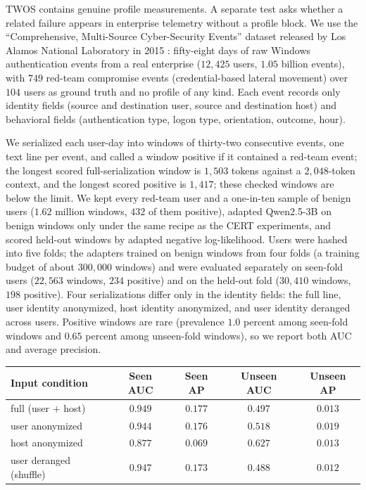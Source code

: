 \documentclass[10pt]{article} %
\begin{document}
TWOS contains genuine profile measurements. A separate test asks whether
a related failure appears in enterprise telemetry without a profile
block. We use the ``Comprehensive, Multi-Source Cyber-Security Events'' dataset released
by Los Alamos National Laboratory in 2015 \citep{kent2015comprehensive}: fifty-eight days of raw Windows
authentication events from a real enterprise ($12{,}425$ users, $1.05$
billion events), with $749$
red-team compromise events (credential-based lateral movement) over $104$
users as ground truth and no profile of any kind. Each event records only
identity fields (source and destination user, source and destination
host) and behavioral fields (authentication type, logon type,
orientation, outcome, hour).

We serialized each user-day into windows of thirty-two consecutive
events, one text line per event, and called a window positive if it contained a red-team event; the longest
scored full-serialization window is $1{,}503$ tokens against a
$2{,}048$-token context, and the longest scored positive is $1{,}417$;
these checked windows are below the limit. We kept every red-team user and a one-in-ten sample of benign
users ($1.62$ million windows, $432$ of them positive), adapted Qwen2.5-3B
on benign windows only under the same recipe as the CERT experiments, and
scored held-out windows by adapted negative log-likelihood. Users were
hashed into five folds; the adapters trained on benign windows from four
folds (a training budget of about $300{,}000$ windows) and were evaluated separately on seen-fold
users ($22{,}563$ windows, $234$ positive) and on the held-out fold
($30{,}410$ windows, $198$ positive). Four serializations differ only in
the identity fields: the full line, user identity anonymized, host
identity anonymized, and user identity deranged across users. Positive windows are rare (prevalence $1.0$ percent among seen-fold windows
and $0.65$ percent among unseen-fold windows), so we report both AUC and
average precision.

\begin{center}
\begin{tabular}{lcccc}
\toprule
Input condition & Seen AUC & Seen AP & Unseen AUC & Unseen AP \\
\midrule
full (user $+$ host)     & $0.949$ & $0.177$ & $0.497$ & $0.013$ \\
user anonymized          & $0.944$ & $0.176$ & $0.518$ & $0.019$ \\
host anonymized          & $0.877$ & $0.069$ & $\mathbf{0.627}$ & $0.013$ \\
user deranged (shuffle)  & $0.947$ & $0.173$ & $0.488$ & $0.012$ \\
\bottomrule
\end{tabular}
\end{center}
\end{document}

